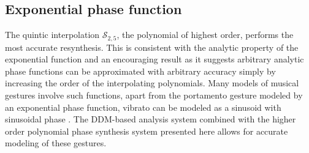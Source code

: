 \subsection{Exponential phase function}

The quintic interpolation $\mathscr{S}_{2,5}$, the polynomial of highest order,
performs the most accurate resynthesis. This is consistent with the analytic
property of the exponential function and an encouraging result as it suggests
arbitrary analytic phase functions can be approximated with arbitrary accuracy
simply by increasing the order of the interpolating polynomials. Many models of
musical gestures involve such functions, apart from the portamento gesture
modeled by an exponential phase function, vibrato can be modeled as a sinusoid
with sinusoidal phase \cite{maher1990investigation}. The DDM-based analysis
system combined with the higher order polynomial phase synthesis system
presented here allows for accurate modeling of these gestures.
